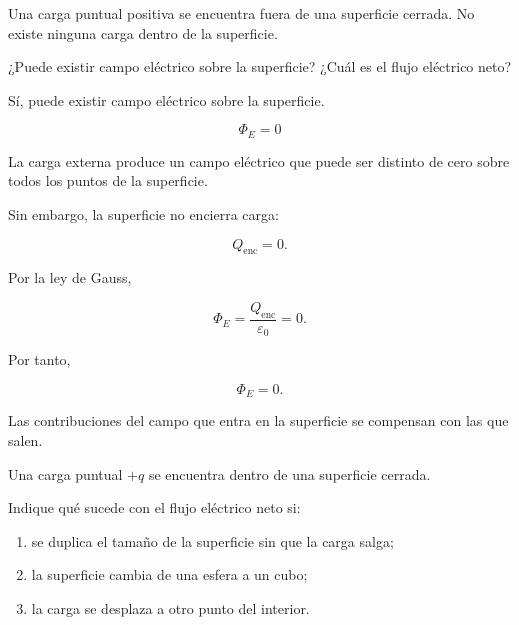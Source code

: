 \begin{ejercicio}

Una carga puntual positiva se encuentra fuera de una superficie cerrada. No existe
ninguna carga dentro de la superficie.

¿Puede existir campo eléctrico sobre la superficie? ¿Cuál es el flujo eléctrico neto?

\end{ejercicio}

\begin{respuesta}

Sí, puede existir campo eléctrico sobre la superficie.

\[
\boxed{\Phi_E=0}
\]

\end{respuesta}

\begin{explicacion}

La carga externa produce un campo eléctrico que puede ser distinto de cero sobre
todos los puntos de la superficie.

Sin embargo, la superficie no encierra carga:

\[
Q_{\text{enc}}=0.
\]

Por la ley de Gauss,

\[
\Phi_E=\frac{Q_{\text{enc}}}{\varepsilon_0}=0.
\]

Por tanto,

\[
\boxed{\Phi_E=0}.
\]

Las contribuciones del campo que entra en la superficie se compensan con las que
salen.

\end{explicacion}


\begin{ejercicio}

Una carga puntual \(+q\) se encuentra dentro de una superficie cerrada.

Indique qué sucede con el flujo eléctrico neto si:

\begin{enumerate}
    \item se duplica el tamaño de la superficie sin que la carga salga;
    \item la superficie cambia de una esfera a un cubo;
    \item la carga se desplaza a otro punto del interior.
\end{enumerate}

\end{ejercicio}

